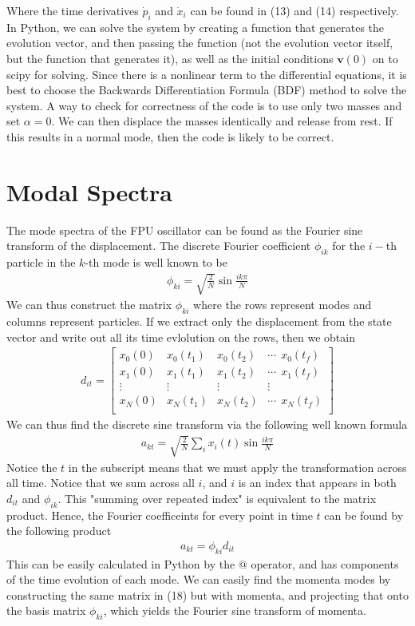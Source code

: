 \documentclass{article}
\newcommand{\ve}{\mathbf}
\begin{document}
Where the time derivatives $\dot{p}_i$ and $\dot{x}_i$ can be found in (13) and (14) respectively. In Python, 
we can solve the system by creating a function that generates the evolution vector, 
and then passing the function (not the evolution vector itself, but the function that generates it), as well as the initial conditions 
$\ve{v}(0)$ on to 
scipy for solving. Since there is a nonlinear term to the differential equations, 
it is best to choose the Backwards Differentiation Formula (BDF) method to solve the system. 
A way to check for correctness of the code is to use only two masses and set 
$\alpha=0$. We can then 
displace the masses identically and release from rest. If this results in a normal mode, then the code is likely to be correct.

\section{Modal Spectra}
The mode spectra of the FPU oscillator can be found as the Fourier sine 
transform of the displacement. The discrete Fourier coefficient $\phi_{ik}$ for the 
$i-$th particle in the $k$-th mode is well known to be 
\begin{align}
    \phi_{ki}=\sqrt{\frac{2}{N}}\sin\frac{ik\pi}{N}
\end{align}
We can thus construct the matrix $\phi_{ki}$ where the rows represent modes and 
columns represent particles. If we extract only the displacement from the state vector
and write out all its time evlolution on the rows, then we obtain 
\begin{align}
    d_{it}=\begin{bmatrix}
        x_0(0)& x_0(t_1) & x_0(t_2) &\cdots \ \  x_0(t_f)\\ 
        x_1(0)& x_1(t_1) & x_1(t_2) &\cdots \ \  x_1(t_f)\\ 
       \vdots& \vdots & \vdots & \vdots\\ 
        x_N(0)& x_N(t_1) & x_N(t_2) &\cdots \ \ x_N(t_f)\\ 
    \end{bmatrix}
\end{align} 
We can thus find the discrete sine transform via the following well known formula 
\begin{align}
    a_{kt}=\sqrt{\frac{2}{N}}\sum_ix_i(t)\sin{\frac{ik\pi}{N}}
\end{align}
Notice the $t$ in the subscript means that we must apply the transformation across 
all time. Notice that we sum across all $i$, and 
$i$ is an index that appears in both $d_{it}$ and $\phi_{ik}$. This "summing over repeated index"
is equivalent to the matrix product.
 Hence, the Fourier coefficeints for every point in time $t$ can be found by 
the following product 
\begin{align}
    a_{kt}=\phi_{ki}d_{it}
\end{align}
This can be easily calculated in Python by the $@$ operator, and has components of the time 
evolution of each mode. We can easily find the momenta modes by constructing the same matrix 
in (18) but with momenta, and projecting that onto the basis matrix $\phi_{ki}$, which yields 
the Fourier sine transform of momenta.
\end{document}
